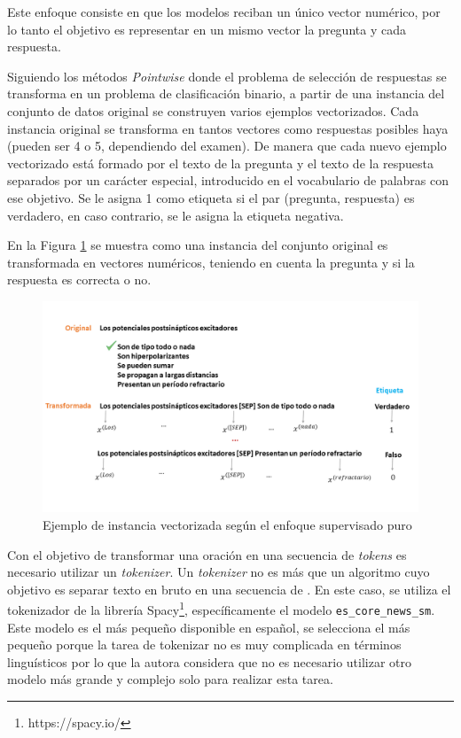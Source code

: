 Este enfoque consiste en que los modelos reciban un único vector numérico, por lo tanto el objetivo es representar en un mismo vector la pregunta y cada respuesta.

Siguiendo los métodos \textit{Pointwise} donde el problema de selección de respuestas se transforma en un problema de clasificación binario, a partir de una instancia del conjunto de datos original se construyen varios ejemplos vectorizados. Cada instancia original se transforma en tantos vectores como respuestas posibles haya (pueden ser 4 o 5, dependiendo del examen). De manera que cada nuevo ejemplo vectorizado está formado por el texto de la pregunta y el texto de la respuesta separados por un carácter especial, introducido en el vocabulario de palabras con ese objetivo. Se le asigna 1 como etiqueta si el par (pregunta, respuesta) es verdadero, en caso contrario, se le asigna la etiqueta negativa.

En la Figura \ref{vect_1} se muestra como una instancia del conjunto original es transformada en vectores numéricos, teniendo en cuenta la pregunta y si la respuesta es correcta o no.

\begin{figure}[!tb]
  \begin{center}
    \includegraphics[angle=0, width=1\textwidth]{Graphics/vect_1.png}
  \end{center}
    \caption{Ejemplo de instancia vectorizada según el enfoque supervisado puro}\label{vect_1}
\end{figure}

Con el objetivo de transformar una oración en una secuencia de \textit{tokens} es necesario utilizar un \textit{tokenizer}. Un \textit{tokenizer} no es más que un algoritmo cuyo objetivo es separar texto en bruto en una secuencia de . En este caso, se utiliza el tokenizador de la librería Spacy\footnote{https://spacy.io/}, específicamente el modelo \texttt{es\_core\_news\_sm}. Este modelo es el más pequeño disponible en español, se selecciona el más pequeño porque la tarea de tokenizar no es muy complicada en términos linguísticos por lo que la autora considera que no es necesario utilizar otro modelo más grande y complejo solo para realizar esta tarea.


